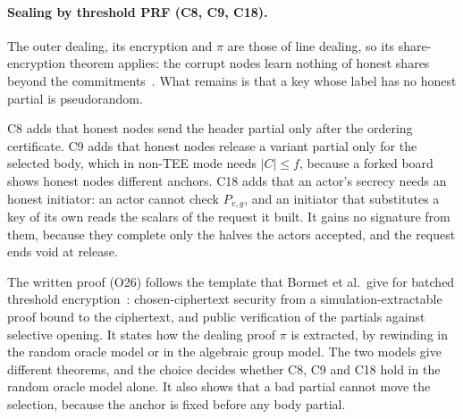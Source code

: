 \paragraph{Sealing by threshold PRF (C8, C9, C18).} The outer dealing, its encryption and $\pi$ are those of line dealing, so its share-encryption theorem applies: the corrupt nodes learn nothing of honest shares beyond the commitments~\cite{LD}. What remains is that a key whose label has no honest partial is pseudorandom.


C8 adds that honest nodes send the header partial only after the ordering certificate. C9 adds that honest nodes release a variant partial only for the selected body, which in non-TEE mode needs $|C| \le f$, because a forked board shows honest nodes different anchors. C18 adds that an actor's secrecy needs an honest initiator: an actor cannot check $P_{v,g}$, and an initiator that substitutes a key of its own reads the scalars of the request it built. It gains no signature from them, because they complete only the halves the actors accepted, and the request ends void at release.

The written proof (O26) follows the template that Bormet et al.\ give for batched threshold encryption~\cite[Theorem~5.1 and Section~6]{BEATMEV}: chosen-ciphertext security from a simulation-extractable proof bound to the ciphertext, and public verification of the partials against selective opening. It states how the dealing proof $\pi$ is extracted, by rewinding in the random oracle model or in the algebraic group model. The two models give different theorems, and the choice decides whether C8, C9 and C18 hold in the random oracle model alone. It also shows that a bad partial cannot move the selection, because the anchor is fixed before any body partial.

